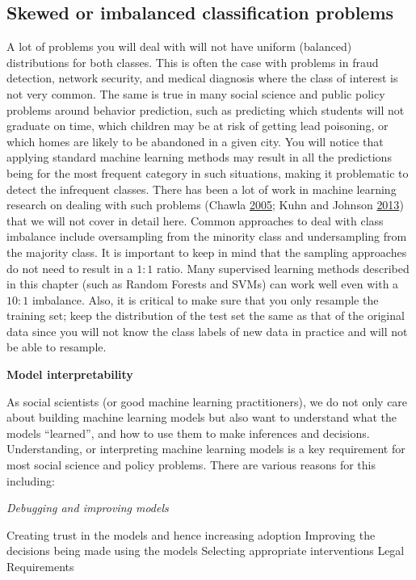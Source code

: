 \documentclass[]{krantz}
\begin{document}
\subsection{Skewed or imbalanced classification
problems}\label{skewed-or-imbalanced-classification-problems}

A lot of problems you will deal with will not have uniform (balanced)
distributions for both classes. This is often the case with problems in
fraud detection, network security, and medical diagnosis where the class
of interest is not very common. The same is true in many social science
and public policy problems around behavior prediction, such as
predicting which students will not graduate on time, which children may
be at risk of getting lead poisoning, or which homes are likely to be
abandoned in a given city. You will notice that applying standard
machine learning methods may result in all the predictions being for the
most frequent category in such situations, making it problematic to
detect the infrequent classes. There has been a lot of work in machine
learning research on dealing with such problems (Chawla
\protect\hyperlink{ref-Chawla05}{2005}; Kuhn and Johnson
\protect\hyperlink{ref-KuhnJohnson2013}{2013}) that we will not cover in
detail here. Common approaches to deal with class imbalance include
oversampling from the minority class and undersampling from the majority
class. It is important to keep in mind that the sampling approaches do
not need to result in a \(1:1\) ratio. Many supervised learning methods
described in this chapter (such as Random Forests and SVMs) can work
well even with a \(10:1\) imbalance. Also, it is critical to make sure
that you only resample the training set; keep the distribution of the
test set the same as that of the original data since you will not know
the class labels of new data in practice and will not be able to
resample.

\textbf{Model interpretability}

As social scientists (or good machine learning practitioners), we do not
only care about building machine learning models but also want to
understand what the models ``learned'', and how to use them to make
inferences and decisions. Understanding, or interpreting machine
learning models is a key requirement for most social science and policy
problems. There are various reasons for this including:

\emph{Debugging and improving models}

Creating trust in the models and hence increasing adoption Improving the
decisions being made using the models Selecting appropriate
interventions Legal Requirements
\end{document}
